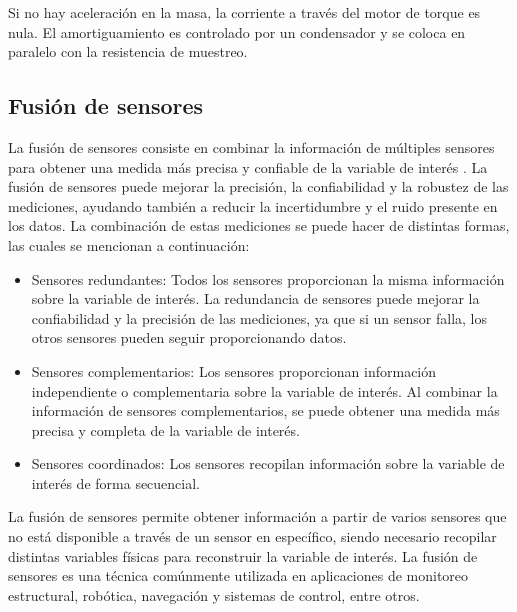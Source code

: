 \begin{itemize}
\begin{itemize}
            Si no hay aceleración en la masa, la corriente a través del motor de torque es nula. El amortiguamiento es controlado por un condensador y se coloca en paralelo con la resistencia de muestreo.
        \end{itemize}

    \end{itemize}

\subsection{Fusión de sensores}
\label{subsec:sensorfusion}

La fusión de sensores consiste en combinar la información de múltiples sensores para obtener una medida más precisa y confiable de la variable de interés \citep{lamkin2019sensors}. La fusión de sensores puede mejorar la precisión, la confiabilidad y la robustez de las mediciones, ayudando también a reducir la incertidumbre y el ruido presente en los datos. La combinación de estas mediciones se puede hacer de distintas formas, las cuales se mencionan a continuación:

\begin{itemize}
    \item Sensores redundantes: Todos los sensores proporcionan la misma información sobre la variable de interés. La redundancia de sensores puede mejorar la confiabilidad y la precisión de las mediciones, ya que si un sensor falla, los otros sensores pueden seguir proporcionando datos.
    
    \item Sensores complementarios: Los sensores proporcionan información independiente o complementaria sobre la variable de interés. Al combinar la información de sensores complementarios, se puede obtener una medida más precisa y completa de la variable de interés.
    \item Sensores coordinados: Los sensores recopilan información sobre la variable de interés de forma secuencial. 
\end{itemize}

La fusión de sensores permite obtener información a partir de varios sensores que no está disponible a través de un sensor en específico, siendo necesario recopilar distintas variables físicas para reconstruir la variable de interés. La fusión de sensores es una técnica comúnmente utilizada en aplicaciones de monitoreo estructural, robótica, navegación y sistemas de control, entre otros.

